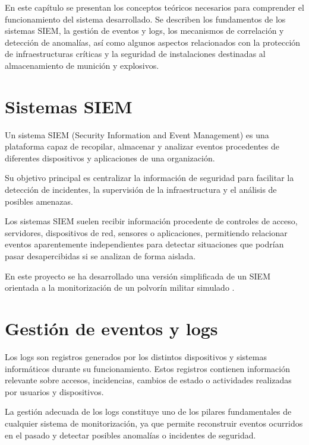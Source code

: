 
En este capítulo se presentan los conceptos teóricos necesarios para comprender el funcionamiento del sistema desarrollado. Se describen los fundamentos de los sistemas SIEM, la gestión de eventos y logs, los mecanismos de correlación y detección de anomalías, así como algunos aspectos relacionados con la protección de infraestructuras críticas y la seguridad de instalaciones destinadas al almacenamiento de munición y explosivos.

\section{Sistemas SIEM}

Un sistema SIEM (Security Information and Event Management) es una plataforma capaz de recopilar, almacenar y analizar eventos procedentes de diferentes dispositivos y aplicaciones de una organización.

Su objetivo principal es centralizar la información de seguridad para facilitar la detección de incidentes, la supervisión de la infraestructura y el análisis de posibles amenazas.

Los sistemas SIEM suelen recibir información procedente de controles de acceso, servidores, dispositivos de red, sensores o aplicaciones, permitiendo relacionar eventos aparentemente independientes para detectar situaciones que podrían pasar desapercibidas si se analizan de forma aislada.

En este proyecto se ha desarrollado una versión simplificada de un SIEM orientada a la monitorización de un polvorín militar simulado \cite{splunk,qradar,wazuh}.

\section{Gestión de eventos y logs}

Los logs son registros generados por los distintos dispositivos y sistemas informáticos durante su funcionamiento. Estos registros contienen información relevante sobre accesos, incidencias, cambios de estado o actividades realizadas por usuarios y dispositivos.

La gestión adecuada de los logs constituye uno de los pilares fundamentales de cualquier sistema de monitorización, ya que permite reconstruir eventos ocurridos en el pasado y detectar posibles anomalías o incidentes de seguridad.

